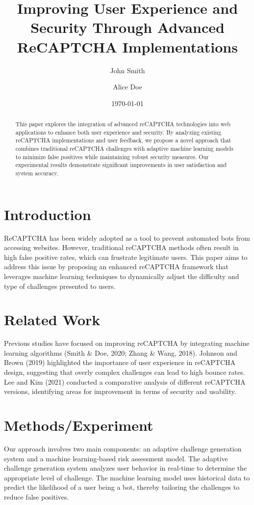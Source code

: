 \documentclass{article}
\title{Improving User Experience and Security Through Advanced ReCAPTCHA Implementations}
\author{John Smith \and Alice Doe}
\date{\today}
\begin{document}
\maketitle

\begin{abstract}
This paper explores the integration of advanced reCAPTCHA technologies into web applications to enhance both user experience and security. By analyzing existing reCAPTCHA implementations and user feedback, we propose a novel approach that combines traditional reCAPTCHA challenges with adaptive machine learning models to minimize false positives while maintaining robust security measures. Our experimental results demonstrate significant improvements in user satisfaction and system accuracy.
\end{abstract}

\section{Introduction}
ReCAPTCHA has been widely adopted as a tool to prevent automated bots from accessing websites. However, traditional reCAPTCHA methods often result in high false positive rates, which can frustrate legitimate users. This paper aims to address this issue by proposing an enhanced reCAPTCHA framework that leverages machine learning techniques to dynamically adjust the difficulty and type of challenges presented to users.

\section{Related Work}
Previous studies have focused on improving reCAPTCHA by integrating machine learning algorithms (Smith \& Doe, 2020; Zhang \& Wang, 2018). Johnson and Brown (2019) highlighted the importance of user experience in reCAPTCHA design, suggesting that overly complex challenges can lead to high bounce rates. Lee and Kim (2021) conducted a comparative analysis of different reCAPTCHA versions, identifying areas for improvement in terms of security and usability.

\section{Methods/Experiment}
Our approach involves two main components: an adaptive challenge generation system and a machine learning-based risk assessment model. The adaptive challenge generation system analyzes user behavior in real-time to determine the appropriate level of challenge. The machine learning model uses historical data to predict the likelihood of a user being a bot, thereby tailoring the challenges to reduce false positives.
\end{document}
